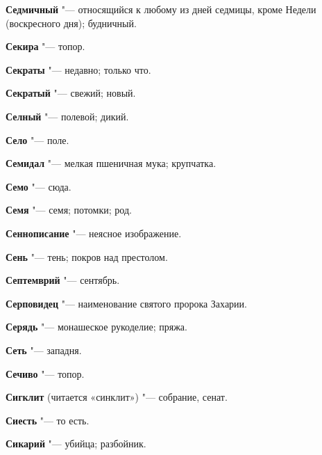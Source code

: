 \begin{mymulticols}{2}
\noindent\textbf{Седмичный} "--- относящийся к любому из дней седмицы, кроме Недели (воскресного дня); будничный. 




\noindent\textbf{Секира} "--- топор. 




\noindent\textbf{Секраты} "--- недавно; только что. 




\noindent\textbf{Секратый} "--- свежий; новый. 




\noindent\textbf{Селный} "--- полевой; дикий. 




\noindent\textbf{Село} "--- поле. 




\noindent\textbf{Семидал} "--- мелкая пшеничная мука; крупчатка. 




\noindent\textbf{Семо} "--- сюда. 




\noindent\textbf{Семя} "--- семя; потомки; род. 




\noindent\textbf{Сеннописание} "--- неясное изображение. 




\noindent\textbf{Сень} "--- тень; покров над престолом. 




\noindent\textbf{Септемврий} "--- сентябрь. 




\noindent\textbf{Серповидец} "--- наименование святого пророка Захарии. 




\noindent\textbf{Серядь} "--- монашеское рукоделие; пряжа. 




\noindent\textbf{Сеть} "--- западня. 




\noindent\textbf{Сечиво} "--- топор. 




\noindent\textbf{Сигклит} (читается «синклит») "--- собрание, сенат. 




\noindent\textbf{Сиесть} "--- то есть. 




\noindent\textbf{Сикарий} "--- убийца; разбойник. 





\end{mymulticols}
